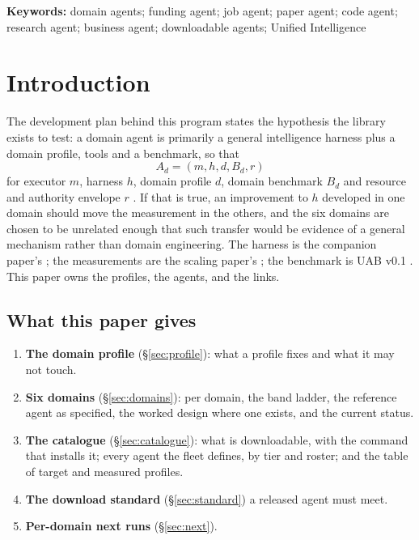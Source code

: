 \documentclass[11pt]{article}
\theoremstyle{definition}
\begin{document}
\noindent\textbf{Keywords:} domain agents; funding agent; job agent; paper agent; code agent; research agent; business agent; downloadable agents; Unified Intelligence

\tableofcontents
\bigskip

\section{Introduction}\label{sec:intro}

The development plan behind this program states the hypothesis the library exists to test: a domain agent is primarily a general intelligence harness plus a domain profile, tools and a benchmark, so that
\[
A_d = (m, h, d, B_d, r)
\]
for executor $m$, harness $h$, domain profile $d$, domain benchmark $B_d$ and resource and authority envelope $r$ \citep{yang2026plan}. If that is true, an improvement to $h$ developed in one domain should move the measurement in the others, and the six domains are chosen to be unrelated enough that such transfer would be evidence of a general mechanism rather than domain engineering. The harness is the companion paper's \citep{yang2026harness}; the measurements are the scaling paper's \citep{yang2026scaling}; the benchmark is UAB v0.1 \citep{yang2026uab}. This paper owns the profiles, the agents, and the links.

\subsection{What this paper gives}

\begin{enumerate}[leftmargin=*]
\item \textbf{The domain profile} (\S\ref{sec:profile}): what a profile fixes and what it may not touch.
\item \textbf{Six domains} (\S\ref{sec:domains}): per domain, the band ladder, the reference agent as specified, the worked design where one exists, and the current status.
\item \textbf{The catalogue} (\S\ref{sec:catalogue}): what is downloadable, with the command that installs it; every agent the fleet defines, by tier and roster; and the table of target and measured profiles.
\item \textbf{The download standard} (\S\ref{sec:standard}) a released agent must meet.
\item \textbf{Per-domain next runs} (\S\ref{sec:next}).
\end{enumerate}
\end{document}
